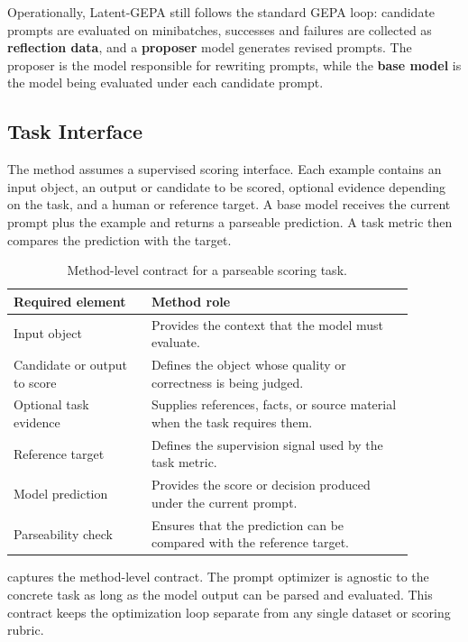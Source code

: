 \documentclass[12pt,a4paper,twoside,openright]{book}
\begin{document}
Operationally, Latent-GEPA still follows the standard GEPA loop: candidate
prompts are evaluated on minibatches, successes and failures are collected as
\textbf{reflection data}, and a \textbf{proposer} model generates revised
prompts. The proposer is the model responsible for rewriting prompts, while the
\textbf{base model} is the model being evaluated under each candidate prompt.

\subsection{Task Interface}
\label{sec:method-task-interface}

The method assumes a supervised scoring interface. Each example contains an
input object, an output or candidate to be scored, optional evidence depending on
the task, and a human or reference target. A base model receives the current
prompt plus the example and returns a parseable prediction. A task metric then
compares the prediction with the target.

\begin{table}[!htb]
    \centering
    \small
    \begin{tabular}{p{0.30\linewidth} p{0.58\linewidth}}
        \toprule
        \textbf{Required element} & \textbf{Method role} \\
        \midrule
        Input object &
        Provides the context that the model must evaluate. \\
        Candidate or output to score &
        Defines the object whose quality or correctness is being judged. \\
        Optional task evidence &
        Supplies references, facts, or source material when the task requires
        them. \\
        Reference target &
        Defines the supervision signal used by the task metric. \\
        Model prediction &
        Provides the score or decision produced under the current prompt. \\
        Parseability check &
        Ensures that the prediction can be compared with the reference target. \\
        \bottomrule
    \end{tabular}
    \caption{Method-level contract for a parseable scoring task.}
    \label{tab:method-scoring-contract}
\end{table}

 captures the method-level contract.
The prompt optimizer is agnostic to the concrete task as long as the model output
can be parsed and evaluated. This contract keeps the optimization loop separate
from any single dataset or scoring rubric.
\end{document}
